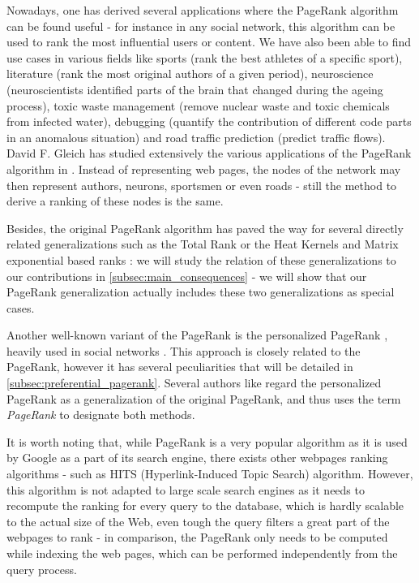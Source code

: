\documentclass[sn-mathphys]{sn-jnl}%
\theoremstyle{thmstyleone}%
\theoremstyle{thmstyletwo}%
\theoremstyle{thmstylethree}%
\begin{document}
Nowadays, one has derived several applications where the PageRank
algorithm can be found useful - for instance in any social network,
this algorithm can be used to rank the most influential users or
content. We have also been able \cite{cornell_pagerank} to find use
cases in various fields like sports (rank the best athletes of a
specific sport), literature (rank the most original authors of a given
period), neuroscience (neuroscientists identified parts of the brain
that changed during the ageing process), toxic waste management
(remove nuclear waste and toxic chemicals from infected water),
debugging (quantify the contribution of different code parts in an
anomalous situation) and road traffic prediction (predict traffic
flows). David F. Gleich has studied extensively the various
applications of the PageRank algorithm in \cite{gleich_2015}. Instead
of representing web pages, the nodes of the network may then represent
authors, neurons, sportsmen or even roads - still the method to derive
a ranking of these nodes is the same.

Besides, the original PageRank algorithm has paved the way for several
directly related generalizations such as the Total Rank
\cite{boldi_2005} or the Heat Kernels and Matrix exponential based
ranks \cite{yang_king_lyu_2007}: we will study the relation of these
generalizations to our contributions in \ref{subsec:main_consequences}
- we will show that our PageRank generalization actually includes
these two generalizations as special cases.

Another well-known variant of the PageRank is the personalized
PageRank \cite{haveliwala_2003, langville_meyer_2004, gleich_2015},
heavily used in social networks \cite{gleich_2015}. This approach is
closely related to the PageRank, however it has several peculiarities
that will be detailed in \ref{subsec:preferential_pagerank}. Several
authors like \cite{gleich_2015} regard the personalized PageRank as a
generalization of the original PageRank, and thus uses the term
\textit{PageRank} to designate both methods.

It is worth noting that, while PageRank is a very popular algorithm as
it is used by Google as a part of its search engine, there exists
other webpages ranking algorithms - such as HITS (Hyperlink-Induced
Topic Search) \cite{kleinberg_hubs, kleinberg_1999}
algorithm. However, this algorithm is not adapted to large scale
search engines as it needs to recompute the ranking for every query to
the database, which is hardly scalable to the actual size of the Web,
even tough the query filters a great part of the webpages to rank - in
comparison, the PageRank only needs to be computed while indexing the
web pages, which can be performed independently from the query
process.
\end{document}
